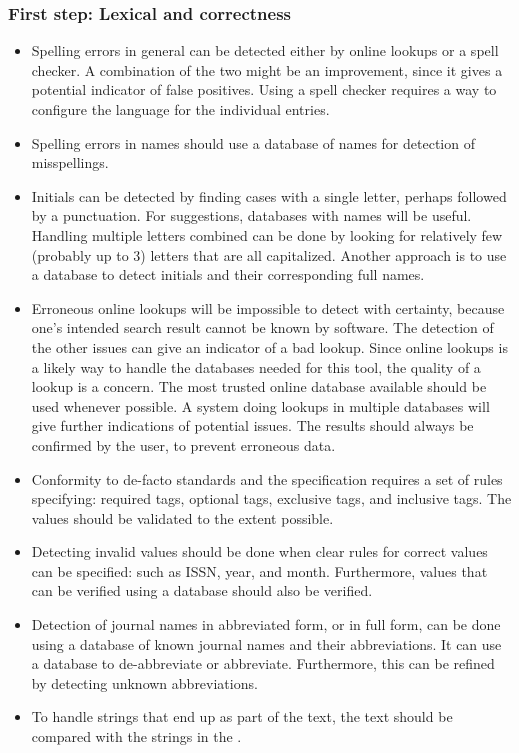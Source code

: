 \subsubsection{First step: Lexical and correctness}
\begin{itemize}
\item Spelling errors in general can be detected either by online
  lookups or a spell checker.  A combination of the two might be an
  improvement, since it gives a potential indicator of false
  positives.  Using a spell checker requires a way to configure the
  language for the individual entries.

\item Spelling errors in names should use a database of names for
  detection of misspellings.

\item Initials can be detected by finding cases with a single letter,
  perhaps followed by a punctuation.  For suggestions, databases with
  names will be useful.  Handling multiple letters combined can be
  done by looking for relatively few (probably up to 3) letters that
  are all capitalized.  Another approach is to use a database to
  detect initials and their corresponding full names.

\item Erroneous online lookups will be impossible to detect with
  certainty, because one's intended search result cannot be known by
  software.  The detection of the other issues can give an indicator
  of a bad lookup.  Since online lookups is a likely way to handle the
  databases needed for this tool, the quality of a lookup is a
  concern.  The most trusted online database available should be used
  whenever possible.  A system doing lookups in multiple databases
  will give further indications of potential issues.  The results
  should always be confirmed by the user, to prevent erroneous data.

\item Conformity to de-facto standards and the {\bibtex} specification
  requires a set of rules specifying: required tags, optional tags,
  exclusive tags, and inclusive tags.  The values should be validated
  to the extent possible.

\item Detecting invalid values should be done when clear rules for
  correct values can be specified: such as ISSN, year, and month.
  Furthermore, values that can be verified using a database should
  also be verified.

\item Detection of journal names in abbreviated form, or in full form,
  can be done using a database of known journal names and their
  abbreviations.  It can use a database to de-abbreviate or
  abbreviate.  Furthermore, this can be refined by detecting unknown
  abbreviations.

\item To handle {\bibtex} strings that end up as part of the text, the
  text should be compared with the strings in the .
\end{itemize}


